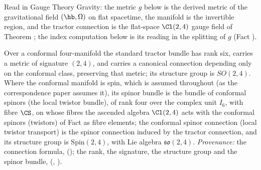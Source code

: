 Read in Gauge Theory Gravity: the metric $g$ below is the derived metric of the gravitational field $(\hb, \Omega)$ on flat spacetime, the manifold is the invertible region, and the tractor connection is the flat-space $\Cl(2,4)$ gauge field of Theorem ; the index computation below is its reading in the splitting of $g$ (Fact ).

Over a conformal four-manifold the standard tractor bundle has rank six, carries a metric of signature $(2,4)$, and carries a canonical connection depending only on the conformal class, preserving that metric; its structure group is $SO(2,4)$. Where the conformal manifold is spin, which is assumed throughout (as the correspondence paper assumes it), its spinor bundle is the bundle of conformal spinors (the local twistor bundle), of rank four over the complex unit $I_6$, with fibre $\CS$, on whose fibres the ascended algebra $\Cl(2,4)$ acts with the conformal spinors (twistors) of Fact  as fibre elements; the conformal spinor connection (local twistor transport) is the spinor connection induced by the tractor connection, and its structure group is $\mathrm{Spin}(2,4)$, with Lie algebra $\mathfrak{so}(2,4)$. \emph{Provenance:} the connection formula, \cite[Fact~4.1]{ButlerT6} (); the rank, the signature, the structure group and the spinor bundle, \cite[Fact~4.9, Prop.~4.10]{ButlerT9} (, ).
